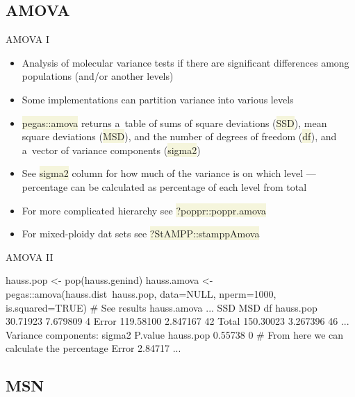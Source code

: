 \documentclass[compress, ucs, xelatex, 11pt, xcolor=svgnames, aspectratio=169,
	hyperref={
		bookmarks=true,
		unicode=true,
		colorlinks=true,
		pdftitle={Molecular data in R},
		plainpages=false,
		pdfauthor={Vojtech Zeisek},
		pdfsubject={Course about phylogeny and evolution in R},
		pdfcreator={XeLaTeX},
		pdfkeywords={R, evolution, phylogeny, molecular data},
		linkcolor=Crimson, %
		anchorcolor=Magenta, %
		citecolor=Magenta, %
		filecolor=Magenta, %
		menucolor=Magenta, %
		urlcolor=DodgerBlue, %
		pdftex},
	url={hyphens, lowtilde} %
	]{beamer}
\renewcommand{\texttt}[1]{\colorbox{Beige}{{\ttfamily #1}}}
\begin{document}
\subsection{AMOVA}

\begin{frame}{AMOVA I}
	\begin{itemize}
		\item Analysis of molecular variance tests if there are significant differences among populations (and/or another levels)
		\item Some implementations can partition variance into various levels
		\item \texttt{pegas::amova} returns a~table of sums of square deviations (\texttt{SSD}), mean square deviations (\texttt{MSD}), and the number of degrees of freedom (\texttt{df}), and a~vector of variance components (\texttt{sigma2})
		\item See \texttt{sigma2} column for how much of the variance is on which level --- percentage can be calculated as percentage of each level from total
		\item For more complicated hierarchy see \texttt{?poppr::poppr.amova}
		\item For mixed-ploidy dat sets see \texttt{?StAMPP::stamppAmova}
	\end{itemize}
\end{frame}

\begin{frame}[fragile]{AMOVA II}
	\begin{spluscode}
    hauss.pop <- pop(hauss.genind)
    hauss.amova <- pegas::amova(hauss.dist~hauss.pop, data=NULL,
      nperm=1000, is.squared=TRUE)
    # See results
    hauss.amova
    ...
                    SSD      MSD df
    hauss.pop  30.71923 7.679809  4
    Error     119.58100 2.847167 42
    Total     150.30023 3.267396 46
    ...
    Variance components:
               sigma2 P.value
    hauss.pop 0.55738       0 # From here we can calculate the percentage
    Error     2.84717
    ...
	\end{spluscode}
\end{frame}

\subsection{MSN}
\end{document}
